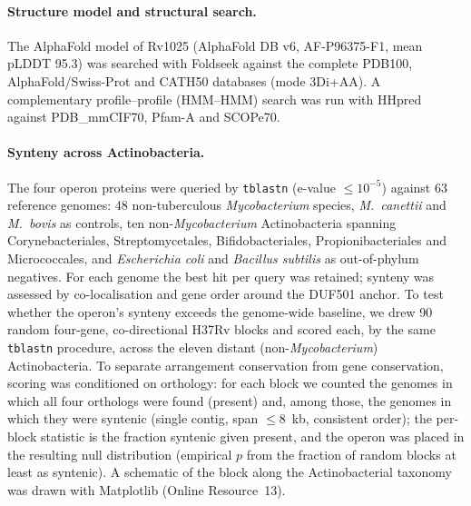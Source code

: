 \documentclass[11pt,a4paper]{article}
\begin{document}
\paragraph{Structure model and structural search.} The AlphaFold model of Rv1025 (AlphaFold DB v6, AF-P96375-F1, mean pLDDT 95.3) \citep{jumper2021alphafold,varadi2022afdb} was searched with Foldseek \citep{vankempen2024foldseek} against the complete PDB100, AlphaFold/Swiss-Prot and CATH50 databases (mode 3Di+AA). A complementary profile--profile (HMM--HMM) search was run with HHpred \citep{zimmermann2018hhpred} against PDB\_mmCIF70, Pfam-A and SCOPe70.

\paragraph{Synteny across Actinobacteria.} The four operon proteins were queried by \texttt{tblastn} \citep{camacho2009blast} (e-value $\leq 10^{-5}$) against 63 reference genomes: 48 non-tuberculous \textit{Mycobacterium} species, \textit{M.\ canettii} and \textit{M.\ bovis} as controls, ten non-\textit{Mycobacterium} Actinobacteria spanning Corynebacteriales, Streptomycetales, Bifidobacteriales, Propionibacteriales and Micrococcales, and \textit{Escherichia coli} and \textit{Bacillus subtilis} as out-of-phylum negatives. For each genome the best hit per query was retained; synteny was assessed by co-localisation and gene order around the DUF501 anchor. To test whether the operon's synteny exceeds the genome-wide baseline, we drew 90 random four-gene, co-directional H37Rv blocks and scored each, by the same \texttt{tblastn} procedure, across the eleven distant (non-\textit{Mycobacterium}) Actinobacteria. To separate arrangement conservation from gene conservation, scoring was conditioned on orthology: for each block we counted the genomes in which all four orthologs were found (present) and, among those, the genomes in which they were syntenic (single contig, span $\leq 8$~kb, consistent order); the per-block statistic is the fraction syntenic given present, and the operon was placed in the resulting null distribution (empirical $p$ from the fraction of random blocks at least as syntenic). A schematic of the block along the Actinobacterial taxonomy was drawn with Matplotlib (Online Resource~13).
\end{document}

